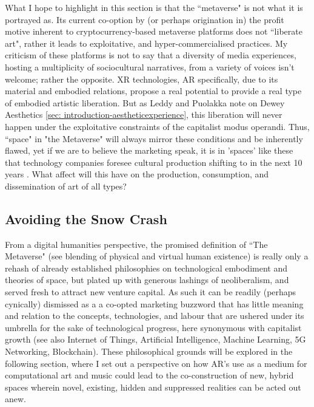 What I hope to highlight in this section is that the ``metaverse" is not what it is portrayed as. Its current co-option by (or perhaps origination in) the profit motive inherent to cryptocurrency-based metaverse platforms does not ``liberate art", rather it leads to exploitative, and hyper-commercialised practices. My criticism of these platforms is not to say that a diversity of media experiences, hosting a multiplicity of sociocultural narratives, from a variety of voices isn't welcome; rather the opposite. XR technologies, AR specifically, due to its material and embodied relations, propose a real potential to provide a real type of embodied artistic liberation. But as Leddy and Puolakka note on Dewey Aesthetics \autoref{sec: introduction-aestheticexperience}, this liberation will never happen under the exploitative constraints of the capitalist modus operandi. Thus, ``space" in "the Metaverse" will always mirror these conditions and be inherently flawed, yet if we are to believe the marketing speak, it is in 'spaces' like these that technology companies foresee cultural production shifting to in the next 10 years \citep[]{fatemi2022}. What affect will this have on the production, consumption, and dissemination of art of all types?

\subsection{Avoiding the Snow Crash}\label{sec: theory-space-avoidingsnowcrash}
From a digital humanities perspective, the promised definition of ``The Metaverse" (see blending of physical and virtual human existence) is really only a rehash of already established philosophies on technological embodiment and theories of space, but plated up with generous lashings of neoliberalism, and served fresh to attract new venture capital. As such it can be readily (perhaps cynically) dismissed as a a co-opted marketing buzzword that has little meaning and relation to the concepts, technologies, and labour that are ushered under its umbrella for the sake of technological progress, here synonymous with capitalist growth (see also Internet of Things, Artificial Intelligence, Machine Learning, 5G Networking, Blockchain). These philosophical grounds will be explored in the following section, where I set out a perspective on how AR's use as a medium for computational art and music could lead to the co-construction of new, hybrid spaces wherein novel, existing, hidden and suppressed realities can be acted out anew. 


